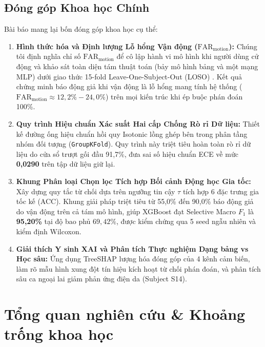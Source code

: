 \documentclass[conference]{IEEEtran}
\begin{document}
\subsection{Đóng góp Khoa học Chính}
Bài báo mang lại bốn đóng góp khoa học cụ thể:
\begin{enumerate}
    \item \textbf{Hình thức hóa và Định lượng Lỗ hổng Vận động ($\text{FAR}_{\text{motion}}$):} Chúng tôi định nghĩa chỉ số $\text{FAR}_{\text{motion}}$ để cô lập hành vi mô hình khi người dùng cử động và khảo sát toàn diện tám thuật toán (bảy mô hình bảng và một mạng MLP) dưới giao thức 15-fold Leave-One-Subject-Out (LOSO) \cite{saeb2017need, little2017using}. Kết quả chứng minh báo động giả khi vận động là lỗ hổng mang tính hệ thống ($\text{FAR}_{\text{motion}} \approx 12,2\% - 24,0\%$) trên mọi kiến trúc khi ép buộc phán đoán 100\%.
    \item \textbf{Quy trình Hiệu chuẩn Xác suất Hai cấp Chống Rò rỉ Dữ liệu:} Thiết kế đường ống hiệu chuẩn hồi quy Isotonic lồng ghép bên trong phân tầng nhóm đối tượng (\texttt{GroupKFold}). Quy trình này triệt tiêu hoàn toàn rò rỉ dữ liệu do cửa sổ trượt gối đầu 91,7\%, đưa sai số hiệu chuẩn ECE về mức \textbf{0,0290} trên tập dữ liệu giữ lại.
    \item \textbf{Khung Phân loại Chọn lọc Tích hợp Bối cảnh Động học Gia tốc:} Xây dựng quy tắc từ chối dựa trên ngưỡng tin cậy $\tau$ tích hợp 6 đặc trưng gia tốc kế (ACC). Khung giải pháp triệt tiêu từ 55,0\% đến 90,0\% báo động giả do vận động trên cả tám mô hình, giúp XGBoost đạt Selective Macro $F_1$ là \textbf{95,20\%} tại độ bao phủ $69,42\%$, được kiểm chứng qua 5 seed ngẫu nhiên và kiểm định Wilcoxon.
    \item \textbf{Giải thích Y sinh XAI và Phân tích Thực nghiệm Dạng bảng vs Học sâu:} Ứng dụng TreeSHAP \cite{lundberg2020local} lượng hóa đóng góp của 4 kênh cảm biến, làm rõ mẫu hình xung đột tín hiệu kích hoạt từ chối phán đoán, và phân tích sâu ca ngoại lai giảm phản ứng điện da (Subject S14).
\end{enumerate}

\section{Tổng quan nghiên cứu \& Khoảng trống khoa học}
\end{document}
